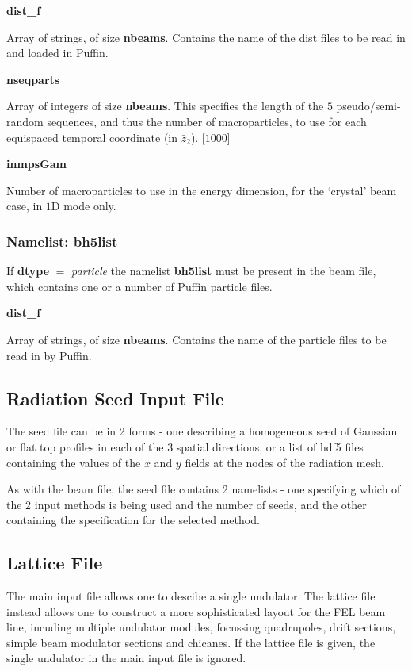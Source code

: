 \documentclass[12pt]{article}%
\begin{document}
{\bf dist\_f}

Array of strings, of size {\bf nbeams}. Contains the name of the dist files to be read in and loaded in Puffin.

{\bf nseqparts}

Array of integers of size {\bf nbeams}. This specifies the length of the $5$ pseudo/semi-random sequences, and thus the number of macroparticles, to use for each equispaced temporal coordinate (in $\bar{z}_2$). [$1000$]

{\bf inmpsGam}

Number of macroparticles to use in the energy dimension, for the `crystal' beam case, in $1$D mode only.


\subsubsection{Namelist: bh5list}

If {\bf dtype} $=$ {\it particle} the namelist {\bf bh5list} must be present in the beam file, which contains one or a number of Puffin particle files.

{\bf dist\_f}

Array of strings, of size {\bf nbeams}. Contains the name of the particle files to be read in by Puffin.



\newpage

\subsection{Radiation Seed Input File}

The seed file can be in 2 forms - one describing a homogeneous seed of Gaussian or flat top profiles in each of the 3 spatial directions, or a list of hdf5 files containing the values of the $x$ and $y$ fields at the nodes of the radiation mesh.

As with the beam file, the seed file contains 2 namelists - one specifying which of the 2 input methods is being used and the number of seeds, and the other containing the specification for the selected method.


\newpage

\subsection{Lattice File}

The main input file allows one to descibe a single undulator. The lattice file instead allows one to construct a more sophisticated layout for the FEL beam line, incuding multiple undulator modules, focussing quadrupoles, drift sections, simple beam modulator sections and chicanes. If the lattice file is given, the single undulator in the main input file is ignored.
\end{document}
